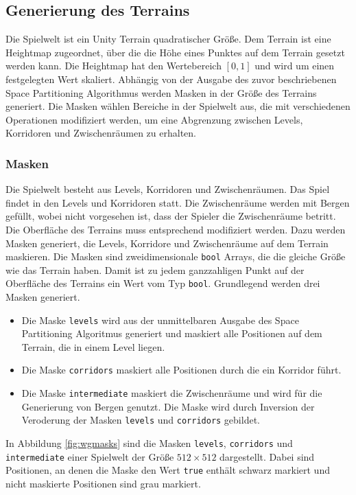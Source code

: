 \subsection{Generierung des Terrains}
Die Spielwelt ist ein Unity Terrain quadratischer Größe. Dem Terrain ist eine Heightmap zugeordnet, über die die Höhe eines Punktes auf dem Terrain gesetzt werden kann. Die Heightmap hat den Wertebereich $[0,1]$ und wird um einen festgelegten Wert skaliert. Abhängig von der Ausgabe des zuvor beschriebenen Space Partitioning Algorithmus werden Masken in der Größe des Terrains generiert. Die Masken wählen Bereiche in der Spielwelt aus, die mit verschiedenen Operationen modifiziert werden, um eine Abgrenzung zwischen Levels, Korridoren und Zwischenräumen zu erhalten.
\subsubsection{Masken}
Die Spielwelt besteht aus Levels, Korridoren und Zwischenräumen. Das Spiel findet in den Levels und Korridoren statt. Die Zwischenräume werden mit Bergen gefüllt, wobei nicht vorgesehen ist, dass der Spieler die Zwischenräume betritt. Die Oberfläche des Terrains muss entsprechend modifiziert werden. Dazu werden Masken generiert, die Levels, Korridore und Zwischenräume auf dem Terrain maskieren. Die Masken sind zweidimensionale \texttt{bool} Arrays, die die gleiche Größe wie das Terrain haben. Damit ist zu jedem ganzzahligen Punkt auf der Oberfläche des Terrains ein Wert vom Typ \texttt{bool}. Grundlegend werden drei Masken generiert. \begin{itemize}
    \item Die Maske \texttt{levels} wird aus der unmittelbaren Ausgabe des Space Partitioning Algoritmus generiert und maskiert alle Positionen auf dem Terrain, die in einem Level liegen.
    \item Die Maske \texttt{corridors} maskiert alle Positionen durch die ein Korridor führt.
    \item Die Maske \texttt{intermediate} maskiert die Zwischenräume und wird für die Generierung von Bergen genutzt. Die Maske wird durch Inversion der Veroderung der Masken \texttt{levels} und \texttt{corridors} gebildet.
\end{itemize}
In Abbildung \ref{fig:wgmasks} sind die Masken \texttt{levels}, \texttt{corridors} und \texttt{intermediate} einer Spielwelt der Größe $512\times 512$ dargestellt. Dabei sind Positionen, an denen die Maske den Wert \texttt{true} enthält schwarz markiert und nicht maskierte Positionen sind grau markiert.


